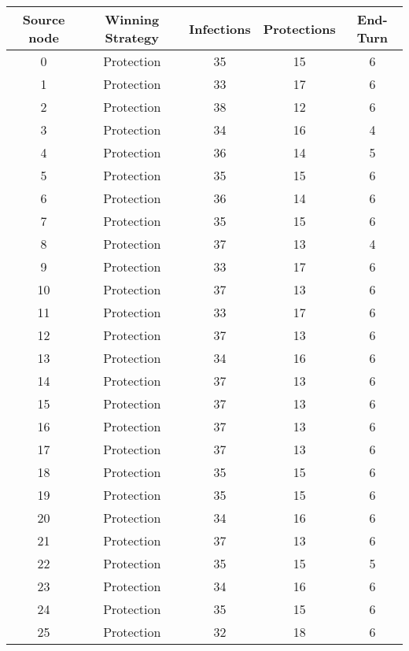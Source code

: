 \documentclass[results.tex]{subfiles}
\begin{document}
\begin{center}
  \begin{tabular}{| c || c | c | c | c |}
    \hline
    {\bfseries Source node} & {\bfseries Winning Strategy} & {\bfseries Infections} & {\bfseries Protections} & {\bfseries End-Turn} \\  %
    \hline\hline
    0 & Protection & 35 & 15 & 6 \\ 
    \hline
    1 & Protection & 33 & 17 & 6 \\ 
    \hline
    2 & Protection & 38 & 12 & 6 \\ 
    \hline
    3 & Protection & 34 & 16 & 4 \\ 
    \hline
    4 & Protection & 36 & 14 & 5 \\ 
    \hline
    5 & Protection & 35 & 15 & 6 \\ 
    \hline
    6 & Protection & 36 & 14 & 6 \\ 
    \hline
    7 & Protection & 35 & 15 & 6 \\ 
    \hline
    8 & Protection & 37 & 13 & 4 \\ 
    \hline
    9 & Protection & 33 & 17 & 6 \\ 
    \hline
    10 & Protection & 37 & 13 & 6 \\ 
    \hline
    11 & Protection & 33 & 17 & 6 \\ 
    \hline
    12 & Protection & 37 & 13 & 6 \\ 
    \hline
    13 & Protection & 34 & 16 & 6 \\ 
    \hline
    14 & Protection & 37 & 13 & 6 \\ 
    \hline
    15 & Protection & 37 & 13 & 6 \\ 
    \hline
    16 & Protection & 37 & 13 & 6 \\ 
    \hline
    17 & Protection & 37 & 13 & 6 \\ 
    \hline
    18 & Protection & 35 & 15 & 6 \\ 
    \hline
    19 & Protection & 35 & 15 & 6 \\ 
    \hline
    20 & Protection & 34 & 16 & 6 \\ 
    \hline
    21 & Protection & 37 & 13 & 6 \\ 
    \hline
    22 & Protection & 35 & 15 & 5 \\ 
    \hline
    23 & Protection & 34 & 16 & 6 \\ 
    \hline
    24 & Protection & 35 & 15 & 6 \\ 
    \hline
    25 & Protection & 32 & 18 & 6 \\ 

\end{tabular}
\end{center}
\end{document}
